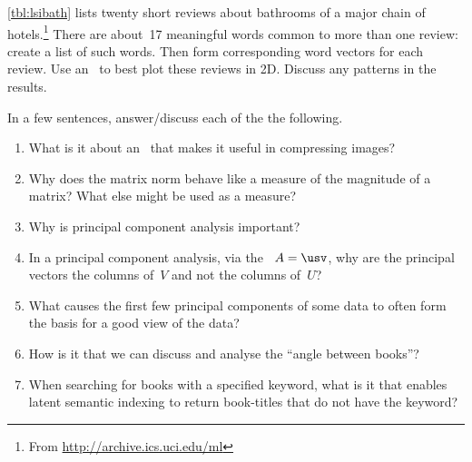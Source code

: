 \begin{exercise} \label{ex:lsibath} 
\autoref{tbl:lsibath} lists twenty short reviews about bathrooms of a major chain of hotels.\footnote{From \protect\url{http://archive.ics.uci.edu/ml}}
There are about~17 meaningful words common to more than one review: create a list of such words.
Then form corresponding word vectors for each review.
Use an \svd\ to best plot these reviews in 2D.
Discuss any patterns in the results.
\end{exercise}






\begin{exercise} \label{ex:} 
In a few sentences, answer\slash discuss each of the the following.
\begin{enumerate}
\item What is it about an \svd\ that makes it useful in compressing images?

\item Why does the matrix norm behave like a measure of the magnitude of a matrix?  What else might be used as a measure?

\item Why is principal component analysis important?

\item In a principal component analysis, via the \svd\ \(A=\usv\), why are the principal vectors the columns of~\(V\) and not the columns of~\(U\)?

\item What causes the first few principal components of some data to often form the basis for a good view of the data?

\item How is it that we can discuss and analyse the ``angle between books''?

\item When searching for books with a specified keyword, what is it that enables latent semantic indexing to return book-titles that do not have the keyword? 

\end{enumerate}
\end{exercise}

\begin{comment}%
why, what caused X?
how did X occur?
what-if? what-if-not?
how does X compare with Y?
what is the evidence for X?
why is X important?
\end{comment}

\endinput%

